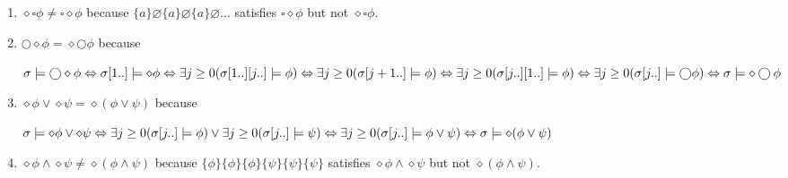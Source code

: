 \documentclass[12pt, a4paper]{article}
\begin{document}
\section{} %
\begin{enumerate}[a]
	\item %
	$\diamond \square \phi \neq \square \diamond \phi$ because $\{a\} \varnothing \{a\} \varnothing \{a\} \varnothing \dots$ satisfies $\square \diamond \phi$ but not $\diamond \square \phi$.
	\item %
	$\bigcirc \diamond \phi = \diamond \bigcirc \phi$ because

	$\sigma \models \bigcirc \diamond \phi\\
	\Leftrightarrow \sigma[1..] \models \diamond \phi\\
	\Leftrightarrow \exists j \geq 0 (\sigma[1..][j..] \models \phi)\\
	\Leftrightarrow \exists j \geq 0 (\sigma[j+1..] \models \phi)\\
	\Leftrightarrow \exists j \geq 0 (\sigma[j..][1..] \models \phi)\\
	\Leftrightarrow \exists j \geq 0 (\sigma[j..] \models \bigcirc \phi)\\
	\Leftrightarrow \sigma \models \diamond \bigcirc \phi$
	\item %
	$\diamond \phi \lor \diamond \psi = \diamond (\phi \lor \psi)$ because

	$\sigma \models \diamond \phi \lor \diamond \psi\\
	\Leftrightarrow \exists j \geq 0 (\sigma[j..] \models \phi) \lor \exists j \geq 0 (\sigma[j..] \models \psi)\\
	\Leftrightarrow \exists j \geq 0 (\sigma[j..] \models \phi \lor \psi)\\
	\Leftrightarrow \sigma \models \diamond (\phi \lor \psi)$
	\item %
	$\diamond \phi \land \diamond \psi \neq \diamond (\phi \land \psi)$ because $\{\phi\} \{\phi\} \{\phi\} \{\psi\} \{\psi\} \{\psi\}$ satisfies $\diamond \phi \land \diamond \psi$ but not $\diamond (\phi \land \psi)$.
\end{enumerate}
\end{document}

